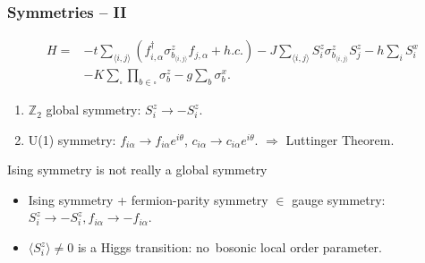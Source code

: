 \documentclass[xcolor=table, 10pt, aspectratio=43]{beamer}
\begin{document}
\begin{frame}
\frametitle{Symmetries -- II}
\begin{align*}
	H= &-t\sum_{\langle i,j \rangle} (f^{\dagger}_{i,\alpha} \sigma^{z}_{b_{\langle i,j \rangle}}f_{j,\alpha} + h.c.)
	-J \sum_{\langle i,j \rangle} S^{z}_{i} \sigma^{z}_{b_{\langle i,j \rangle}} S^{z}_{j} - h \sum_{i} S^{x}_{i}\\
&-K \sum_{\square}\prod_{b\in\square} \sigma^{z}_{b} - g\sum_{b} \sigma^{x}_{b}.
\end{align*}
\begin{enumerate}
	\addtocounter{enumi}{1}
\item $\mathbb Z_2$ \alert{global} symmetry:
$S_i^z\rightarrow -S_i^z$.
\item U(1) symmetry:
$f_{i\alpha}\rightarrow f_{i\alpha}e^{i\theta}$, $c_{i\alpha}\rightarrow c_{i\alpha}e^{i\theta}$.
$\Rightarrow$ Luttinger Theorem.
\end{enumerate}
\begin{block}{Ising symmetry is not really a global symmetry}
\begin{itemize}
\item Ising symmetry + fermion-parity symmetry $\in$ gauge symmetry:\\
$S_i^z\rightarrow-S_i^z,f_{i\alpha}\rightarrow-f_{i\alpha}$.
\item $\langle S_i^z\rangle\neq0$ is a \alert{Higgs} transition:
no\ bosonic local order parameter.
\end{itemize}
\end{block}
\end{frame}
\end{document}
